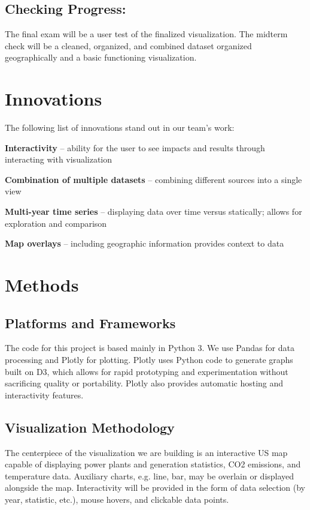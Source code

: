 \documentclass[sigconf,nonacm=true]{acmart}
\newenvironment{my_itemize}{
	\begin{itemize}
		\setlength{\itemsep}{1pt}
		\setlength{\parskip}{0pt}
		\setlength{\parsep}{0pt}}
	{\end{itemize}
}
\begin{document}
\subsection{Checking Progress:}
The final exam will be a user test of the finalized visualization. The midterm check will be a cleaned, organized, and combined dataset organized geographically and a basic functioning visualization. 

\section{Innovations}
The following list of innovations stand out in our team’s work: 
\begin{my_itemize}
\item \textbf{Interactivity} – ability for the user to see impacts and results through interacting with visualization 
\item \textbf{Combination of multiple datasets} – combining different sources into a single view 
\item \textbf{Multi-year time series} – displaying data over time versus statically; allows for exploration and comparison 
\item \textbf{Map overlays} – including geographic information provides context to data 
\end{my_itemize}

\section{Methods}
\subsection{Platforms and Frameworks}
The code for this project is based mainly in Python 3. We use Pandas for data processing and Plotly for plotting. Plotly uses Python code to generate graphs built on D3, which allows for rapid prototyping and experimentation without sacrificing quality or portability. Plotly also provides automatic hosting and interactivity features.  

\subsection{Visualization Methodology}
The centerpiece of the visualization we are building is an interactive US map capable of displaying power plants and generation statistics, CO2 emissions, and temperature data. Auxiliary charts, e.g. line, bar, may be overlain or displayed alongside the map. Interactivity will be provided in the form of data selection (by year, statistic, etc.), mouse hovers, and clickable data points. \\
\end{document}
